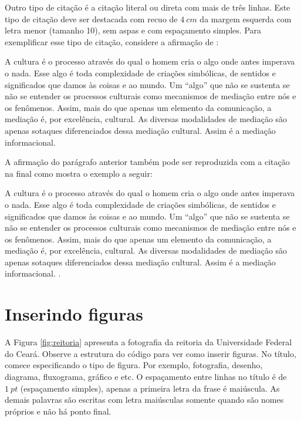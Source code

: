     Outro tipo de citação é a citação literal ou direta com mais de três linhas. Este tipo de citação deve ser destacada com recuo de $4~cm$ da margem esquerda com letra menor (tamanho 10), sem aspas e com espaçamento simples.  Para exemplificar esse tipo de citação, considere a afirmação de :
    \begin{citacao}
        A cultura é o processo através do qual o homem cria o algo onde antes imperava o nada. Esse algo é toda complexidade de criações simbólicas, de sentidos e significados que damos às coisas e ao mundo. Um ``algo'' que não se sustenta se não se entender os processos culturais como mecanismos de mediação entre nós e os fenômenos. Assim, mais do que apenas um elemento da comunicação, a mediação é, por excelência, cultural. As diversas modalidades de mediação são apenas sotaques diferenciados dessa mediação cultural. Assim é a mediação informacional.
    \end{citacao}
        
    A afirmação do parágrafo anterior também pode ser reproduzida com a citação na final como mostra o exemplo a seguir: 
    \begin{citacao}
        A cultura é o processo através do qual o homem cria o algo onde antes imperava o nada. Esse algo é toda complexidade de criações simbólicas, de sentidos e significados que damos às coisas e ao mundo. Um “algo” que não se sustenta se não se entender os processos culturais como mecanismos de mediação entre nós e os fenômenos. Assim, mais do que apenas um elemento da comunicação, a mediação é, por excelência, cultural. As diversas modalidades de mediação são apenas sotaques diferenciados dessa mediação cultural. Assim é a mediação informacional. \cite[p.~98]{feitosa2016}.
    \end{citacao}
        

\section{Inserindo figuras}\label{sec:figuras}
    
    A Figura \ref{fig:reitoria} apresenta a fotografia da reitoria da Universidade Federal do Ceará. Observe a estrutura do código para ver como inserir figuras. No título, comece especificando o tipo de figura. Por exemplo, fotografia, desenho, diagrama, fluxograma, gráfico e etc. O espaçamento entre linhas no título é de $1~pt$ (espaçamento simples), apenas a primeira letra da frase é maiúscula. As demais palavras são escritas com letra maiúsculas somente quando são nomes próprios e não há ponto final. 
    
